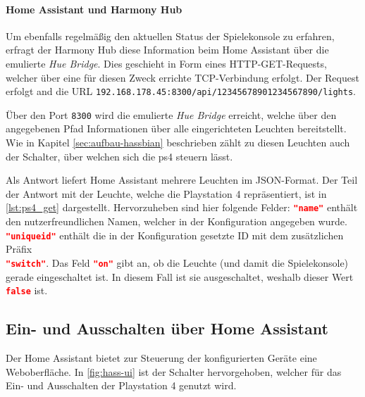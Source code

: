 






\paragraph{Home Assistant und Harmony Hub}
Um ebenfalls regelmäßig den aktuellen Status der Spielekonsole zu erfahren,
erfragt der Harmony Hub diese Information beim Home Assistant über die emulierte \textit{Hue Bridge}.
Dies geschieht in Form eines HTTP-GET-Requests,
welcher über eine für diesen Zweck errichte TCP-Verbindung erfolgt.
Der Request erfolgt and die URL \nolinkurl{192.168.178.45:8300/api/12345678901234567890/lights}.

Über den Port \texttt{8300} wird die emulierte \textit{Hue Bridge} erreicht,
welche über den angegebenen Pfad Informationen über alle eingerichteten Leuchten bereitstellt.
Wie in Kapitel \ref{sec:aufbau-hassbian} \textit{} beschrieben zählt zu diesen Leuchten
auch der Schalter, über welchen sich die \ac{ps4} steuern lässt.

Als Antwort liefert Home Assistant mehrere Leuchten im JSON-Format.
Der Teil der Antwort mit der Leuchte,
welche die Playstation 4 repräsentiert,
ist in \autoref{lst:ps4_get} dargestellt.
Hervorzuheben sind hier folgende Felder:
\lstinline[language=json]{"name"} enthält den nutzerfreundlichen Namen,
welcher in der Konfiguration angegeben wurde.
\lstinline[language=json]{"uniqueid"} enthält die
in der Konfiguration gesetzte ID mit dem zusätzlichen Präfix \\\lstinline[language=json]{"switch"}.
Das Feld \lstinline[language=json]{"on"} gibt an, ob die Leuchte (und damit die Spielekonsole) gerade eingeschaltet ist.
In diesem Fall ist sie ausgeschaltet, weshalb dieser Wert \lstinline[language=json]{false} ist.



\newpage

\subsection{Ein- und Ausschalten über Home Assistant}\label{sec:durchfuehrung-hassbian}
Der Home Assistant bietet zur Steuerung der konfigurierten Geräte eine Weboberfläche.
In \autoref{fig:hass-ui} ist der Schalter hervorgehoben, welcher für das Ein- und Ausschalten der Playstation 4 genutzt wird.

